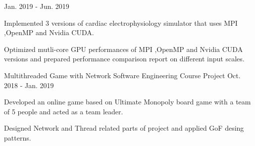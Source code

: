 \begin{cventries}
    {} %
    {Jan. 2019 - Jun. 2019} %
    {
      \begin{cvitems} %
      	\item {Implemented 3 versions of cardiac electrophysiology simulator that uses MPI ,OpenMP and Nvidia CUDA.}
      	\item {Optimized mutli-core GPU performances of MPI ,OpenMP and Nvidia CUDA versions and prepared performance comparison report on different input scales.}
      \end{cvitems}
    }
  \cventry
   {Multithreaded Game with Network} %
    {Software Engineering Course Project} %
    {} %
    {Oct. 2018 - Jan. 2019} %
    {
      \begin{cvitems} %
      	\item {Developed an online game based on Ultimate Monopoly board game with a team of 5 people and acted as a team leader.} 
      	\item {Designed Network and Thread related parts of project and applied GoF desing patterns.} 
      \end{cvitems}
    }

\end{cventries}
